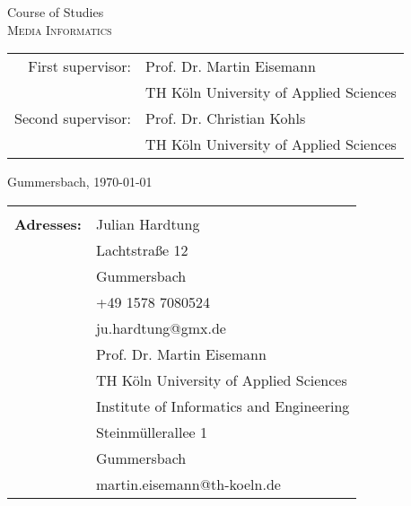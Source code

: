 \begin{titlepage}
\begin{center}
		\vspace{0.4cm}
		
		\begin{large}
			Course of Studies\\ 
			\vspace{0.2cm}
			\textsc{Media Informatics}
		\end{large}
		
		\vspace{1.0cm}
		
		\begin{tabular}{rl}
			First supervisor: 	& Prof. Dr. Martin Eisemann\\
						& \small TH Köln University of Applied Sciences\\[1.0em]
			Second supervisor: 	& Prof. Dr. Christian Kohls\\
						& \small TH Köln University of Applied Sciences
		\end{tabular}
		
		\vspace{0.6cm}
		
		\begin{large}
			Gummersbach, \today
		\end{large}
	\end{center}
		
	\newpage
	\thispagestyle{empty}
		
		
	\begin{center}
		\begin{tabular}{rl}
						&  \\[27.0em]
									
		\large \textbf{Adresses:}	&  	\quad Julian Hardtung\\
						&  	\quad Lachtstraße 12 \\
						&	\quad 51645 Gummersbach\\
						&     \quad +49 1578 7080524\\
						&  	\quad ju.hardtung@gmx.de\\[2.0em]
									
						&  	\quad Prof. Dr. Martin Eisemann\\
						&  	\quad TH Köln University of Applied Sciences\\
						&  	\quad Institute of Informatics and Engineering\\
						&	\quad Steinmüllerallee 1\\
						&	\quad 51643 Gummersbach\\
						&  	\quad martin.eisemann@th-koeln.de\\[2.0em]
									

\end{tabular}
\end{center}
\end{titlepage}
